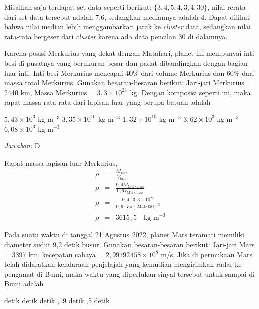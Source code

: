 \documentclass[11pt,fleqn]{exam}
\begin{document}
\begin{questions}
Misalkan saja terdapat set data seperti berikut:
$\{3, 4, 5, 4, 3, 4, 30\}$, nilai rerata dari set data tersebut adalah 7.6, sedangkan mediannya adalah 4. Dapat dilihat bahwa nilai median lebih menggambarkan jarak ke \textit{cluster} data, sedangkan nilai rata-rata bergeser dari \textit{cluster} karena ada data pencilan 30 di dalamnya.  


\vspace{0.5cm}
\question Karena posisi Merkurius yang dekat dengan Matahari, planet ini mempunyai inti besi di pusatnya yang berukuran besar dan padat dibandingkan dengan bagian luar inti. Inti besi Merkurius mencapai 40\% dari volume Merkurius dan 60\% dari massa total Merkurius. Gunakan besaran-besaran berikut: Jari-jari Merkurius = 2440 km, Massa Merkurius = $3,3 \times 10^{23}$ kg. Dengan komposisi seperti ini, maka rapat massa rata-rata dari lapisan luar yang berupa batuan adalah
\begin{choices}
\choice $5,43 \times 10^{3}$ kg m$^{-3}$
\choice $3,35 \times 10^{10}$ kg m$^{-3}$
\choice $1,32 \times 10^{10}$ kg m$^{-3}$
\choice $3,62 \times 10^{3}$ kg m$^{-3}$
\choice $6,08 \times 10^{3}$ kg m$^{-3}$
\end{choices}

\bigskip
\textit{Jawaban: } D

Rapat massa lapisan luar Merkurius,
\begin{eqnarray*}
    \rho &=& \frac{M_\text{luar}}{V_\text{luar}}\\
    \rho &=& \frac{0,4 M_\text{Merkurius}}{0,6 V_\text{Merkurius}}\\
    \rho &=& \frac{0,4 \cdot 3,3\times 10^{23}}{0,6 \cdot \frac{4}{3} \pi (2440000)^3}\\
    \rho &=& 3615,5 \quad \text{kg m}^{-3}
\end{eqnarray*}


\vspace{0.5cm}
\question Pada suatu waktu di tanggal 21 Agustus 2022, planet Mars teramati memiliki diameter sudut 9,2 detik busur. Gunakan besaran-besaran berikut: Jari-jari Mars = 3397 km, kecepatan cahaya = $2,99792458 \times 10^8$ m/s. Jika di permukaan Mars telah didaratkan kendaraan penjelajah yang kemudian mengirimkan radar ke pengamat di Bumi, maka waktu yang diperlukan sinyal tersebut untuk sampai di Bumi adalah
\begin{choices}
 detik
 detik
 detik
,19 detik
,5 detik
\end{choices}


\end{questions}
\end{document}
